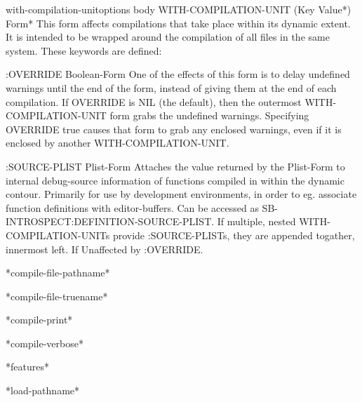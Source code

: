 \documentclass[10pt,english]{book}
\begin{document}
\begin{macro}{with-compilation-unit}{options \body body}
  WITH-COMPILATION-UNIT ({Key Value}*) Form*
  This form affects compilations that take place within its dynamic extent. It
  is intended to be wrapped around the compilation of all files in the same
  system. These keywords are defined:

    :OVERRIDE Boolean-Form
        One of the effects of this form is to delay undefined warnings
        until the end of the form, instead of giving them at the end of each
        compilation. If OVERRIDE is NIL (the default), then the outermost
        WITH-COMPILATION-UNIT form grabs the undefined warnings. Specifying
        OVERRIDE true causes that form to grab any enclosed warnings, even if
        it is enclosed by another WITH-COMPILATION-UNIT.

    :SOURCE-PLIST Plist-Form
        Attaches the value returned by the Plist-Form to internal debug-source
        information of functions compiled in within the dynamic contour.
        Primarily for use by development environments, in order to eg. associate
        function definitions with editor-buffers. Can be accessed as
        SB-INTROSPECT:DEFINITION-SOURCE-PLIST. If multiple, nested
        WITH-COMPILATION-UNITs provide :SOURCE-PLISTs, they are appended
        togather, innermost left. If  Unaffected by :OVERRIDE.
\end{macro}

\begin{variable}{*compile-file-pathname*}{}
  
\end{variable}

\begin{variable}{*compile-file-truename*}{}
  
\end{variable}

\begin{variable}{*compile-print*}{}
  
\end{variable}

\begin{variable}{*compile-verbose*}{}
  
\end{variable}

\begin{variable}{*features*}{}
  
\end{variable}

\begin{variable}{*load-pathname*}{}
  
\end{variable}
\end{document}
